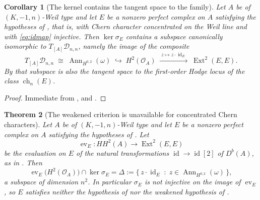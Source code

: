 \documentclass[11pt,reqno]{amsart}
\theoremstyle{plain}
\newtheorem{theorem}{Theorem}[section]
\newtheorem{corollary}[theorem]{Corollary}
\theoremstyle{definition}
\theoremstyle{remark}
\newcommand{\cO}{\mathcal{O}}
\newcommand{\cD}{\mathcal{D}}
\DeclareMathOperator{\ch}{ch}
\DeclareMathOperator{\Ext}{Ext}
\DeclareMathOperator{\id}{id}
\DeclareMathOperator{\Ann}{Ann}
\begin{document}
\begin{corollary}[The kernel contains the tangent space to the family]
\label{cor:kernelfamily}
Let $A$ be of $(K,-1,n)$-Weil type and let $E$ be a nonzero perfect complex on
$A$ satisfying the hypotheses of , that is, with Chern
character concentrated on the Weil line and with \eqref{eq:idmap} injective.
Then $\ker\sigma_{E}$ contains a subspace canonically isomorphic to
$T_{[A]}\cD_{n,n}$, namely the image of the composite
\[
  T_{[A]}\cD_{n,n}\;\cong\;\operatorname{Ann}_{H^{0,2}}(\omega)
  \;\hookrightarrow\;H^{2}(\cO_{A})\;\xrightarrow{\;z\mapsto z\cdot\id_{E}\;}\;
  \Ext^{2}(E,E).
\]
By  that subspace is also the tangent space to the
first-order Hodge locus of the class $\ch_{n}(E)$.
\end{corollary}

\begin{proof}
Immediate from ,  and
.
\end{proof}

\begin{theorem}[The weakened criterion is unavailable for concentrated
Chern characters]\label{thm:weakfails}
Let $A$ be of $(K,-1,n)$-Weil type and let $E$ be a nonzero perfect complex on
$A$ satisfying the hypotheses of . Let
\[
  \operatorname{ev}_{E}\colon HH^{2}(A)\longrightarrow\Ext^{2}(E,E)
\]
be the evaluation on $E$ of the natural transformations $\id\to\id[2]$ of
$D^{b}(A)$, as in \cite[Section 11.4]{Mar25b}. Then
\[
  \operatorname{ev}_{E}\bigl(H^{2}(\cO_{A})\bigr)\cap\ker\sigma_{E}
  =\Delta:=\bigl\{\,z\cdot\id_{E}\;:\;z\in\Ann_{H^{0,2}}(\omega)\,\bigr\},
\]
a subspace of dimension $n^{2}$. In particular $\sigma_{E}$ is not injective
on the image of $\operatorname{ev}_{E}$, so $E$ satisfies neither the
hypothesis of \cite[Lemma 11.3]{Mar25b} nor the weakened hypothesis of
\cite[Question 11.4]{Mar25b}.
\end{theorem}
\end{document}

